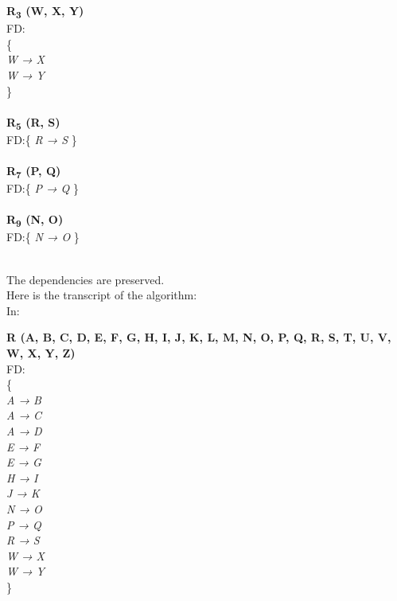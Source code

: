 \begin{multicols}{2}
\begin{adjustwidth}{2cm}{}
\noindent
\textbf{R\textsubscript{3} (W, X, Y)}\\
FD:\\
\{\\
\textit{ 
W → X\\
W → Y\\ 
}
\} \\ \\

\noindent
\textbf{R\textsubscript{5} (R, S)}\\
FD:\{
\textit{ 
R → S 
}
\} \\ \\

\noindent
\textbf{R\textsubscript{7} (P, Q)}\\
FD:\{
\textit{ 
P → Q 
}
\} \\ \\

\noindent
\textbf{R\textsubscript{9} (N, O)}\\
FD:\{
\textit{ 
N → O 
}
\} \\ \\

\end{adjustwidth}
\end{multicols}

The dependencies are preserved.\\

Here is the transcript of the algorithm:\\

In:\\

\begin{adjustwidth}{2cm}{}
\textbf{R (A, B, C, D, E, F, G, H, I, J, K, L, M, N, O, P, Q, R, S, T, U, V, W, X, Y, Z)}\\
FD: \\
\{ \\
\textit{
A → B\\
A → C\\
A → D\\
E → F\\
E → G\\
H → I\\
J → K\\
N → O\\
P → Q\\
R → S\\
W → X\\
W → Y\\
}
\}\\
\end{adjustwidth}
 

